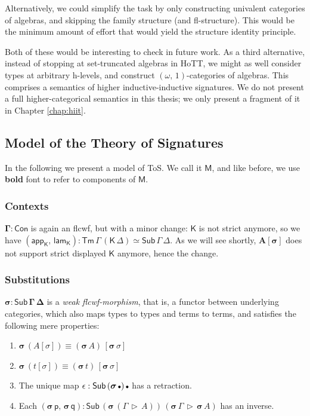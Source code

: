 \documentclass[12pt,a4paper,twoside,openany]{book}
\theoremstyle{remark}
\theoremstyle{definition}
\theoremstyle{theorem}
\newcommand{\bs}[1]{\boldsymbol{#1}}
\newcommand{\Con}{\mathsf{Con}}
\newcommand{\Sub}{\mathsf{Sub}}
\newcommand{\Tm}{\mathsf{Tm}}
\newcommand{\ext}{\triangleright}
\newcommand{\emptycon}{\scaleobj{.75}\bullet}
\newcommand{\lamK}{\mathsf{lam}_{\K}}
\newcommand{\appK}{\mathsf{app}_{\K}}
\newcommand{\p}{\mathsf{p}}
\newcommand{\q}{\mathsf{q}}
\newcommand{\K}{\mathsf{K}}
\newcommand{\bCon}{\bs{\Con}}
\newcommand{\bGamma}{\bs{\Gamma}}
\newcommand{\bsigma}{\bs{\sigma}}
\newcommand{\bM}{\bs{\mathsf{M}}}
\begin{document}
Alternatively, we could simplify the task by only constructing univalent
categories of algebras, and skipping the family structure (and
fl-structure). This would be the minimum amount of effort that would yield the
structure identity principle.

Both of these would be interesting to check in future work. As a third
alternative, instead of stopping at set-truncated algebras in HoTT, we might as
well consider types at arbitrary h-levels, and construct
$(\omega,\,1)$-categories of algebras. This comprises a semantics of higher
inductive-inductive signatures. We do not present a full higher-categorical
semantics in this thesis; we only present a fragment of it in Chapter
\ref{chap:hiit}.

\subsection{Model of the Theory of Signatures}

In the following we present a model of ToS. We call it $\bM$, and like before,
we use \textbf{bold} font to refer to components of $\bM$.

\subsubsection{Contexts}

$\bGamma : \bCon$ is again an flcwf, but with a minor change: $\K$ is not strict
anymore, so we have $(\appK,\,\lamK) : \Tm\,\Gamma\,(\K\,\Delta) \simeq
\Sub\,\Gamma\,\Delta$. As we will see shortly, $\bs{A[\sigma]}$ does not
support strict displayed $\K$ anymore, hence the change.

\subsubsection{Substitutions}
\label{sec:iqiit-substitutions}

$\bs{\sigma : \Sub\,\Gamma\,\Delta}$ is a \emph{weak flcwf-morphism}, that is, a
functor between underlying categories, which also maps types to types and terms
to terms, and satisfies the following mere properties:
  \begin{enumerate}
    \item $\bsigma\,(A[\sigma]) \equiv (\bsigma\,A)\,[\bsigma\,\sigma]$
    \item $\bsigma\,(t[\sigma]) \equiv (\bsigma\,t)\,[\bsigma\,\sigma]$
    \item The unique map $\epsilon : \Sub\,(\bsigma\,\emptycon)\,\emptycon$ has a retraction.
    \item Each $(\bsigma\,\p,\,\bsigma\,\q) : \Sub\,(\bsigma\,(\Gamma\,\ext\,A))\,(\bsigma\,\Gamma\,\ext\,\bsigma\,A)$ has an inverse.
  \end{enumerate}
\end{document}
